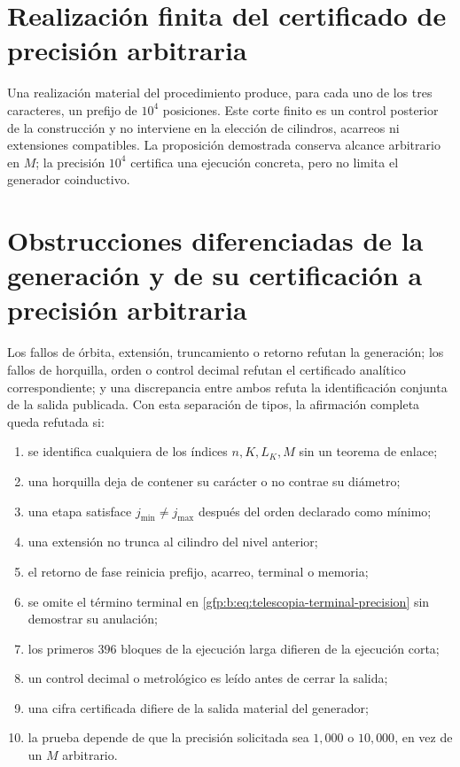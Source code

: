 \section{Realización finita del certificado de precisión arbitraria}

Una realización material del procedimiento produce, para cada uno de los tres caracteres, un prefijo de \(10^4\) posiciones. Este corte finito es un control posterior de la construcción y no interviene en la elección de cilindros, acarreos ni extensiones compatibles. La proposición demostrada conserva alcance arbitrario en \(M\); la precisión \(10^4\) certifica una ejecución concreta, pero no limita el generador coinductivo.

\section{Obstrucciones diferenciadas de la generación y de su certificación a precisión arbitraria}

\begin{remark}
Los fallos de órbita, extensión, truncamiento o retorno refutan la generación;
los fallos de horquilla, orden o control decimal refutan el certificado
analítico correspondiente; y una discrepancia entre ambos refuta la
identificación conjunta de la salida publicada. Con esta separación de tipos,
la afirmación completa queda refutada si:
\begin{enumerate}
 \item se identifica cualquiera de los índices \(n,K,L_K,M\) sin un
       teorema de enlace;
 \item una horquilla deja de contener su carácter o no contrae su diámetro;
 \item una etapa satisface \(j_{\min}\ne j_{\max}\) después del orden
       declarado como mínimo;
 \item una extensión no trunca al cilindro del nivel anterior;
 \item el retorno de fase reinicia prefijo, acarreo, terminal o memoria;
 \item se omite el término terminal en
       \eqref{gfp:b:eq:telescopia-terminal-precision} sin demostrar su anulación;
 \item los primeros \(396\) bloques de la ejecución larga difieren de la
       ejecución corta;
 \item un control decimal o metrológico es leído antes de cerrar la salida;
 \item una cifra certificada difiere de la salida material del generador;
 \item la prueba depende de que la precisión solicitada sea \(1,000\) o
       \(10,000\), en vez de un \(M\) arbitrario.
\end{enumerate}
\end{remark}
